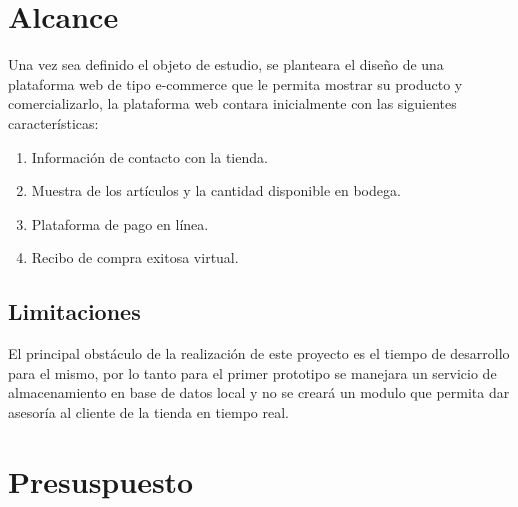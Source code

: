 \section{Alcance}
Una vez sea definido el objeto de estudio, se planteara el diseño de una plataforma web de tipo e-commerce que le permita mostrar su producto y comercializarlo, la plataforma web contara inicialmente con las siguientes características:

\begin{enumerate}
	\item Información de contacto con la tienda.
	\item Muestra de los artículos y la cantidad disponible en bodega.
	\item Plataforma de pago en línea.
	\item Recibo de compra exitosa virtual.
\end{enumerate}

\subsection{Limitaciones}
El principal obstáculo de la realización de este proyecto es el tiempo de desarrollo para el mismo, por lo tanto para el primer prototipo se manejara un servicio de almacenamiento en base de datos local y no se creará un modulo que permita dar asesoría al cliente de la tienda en tiempo real.

\newpage

\section{Presuspuesto}